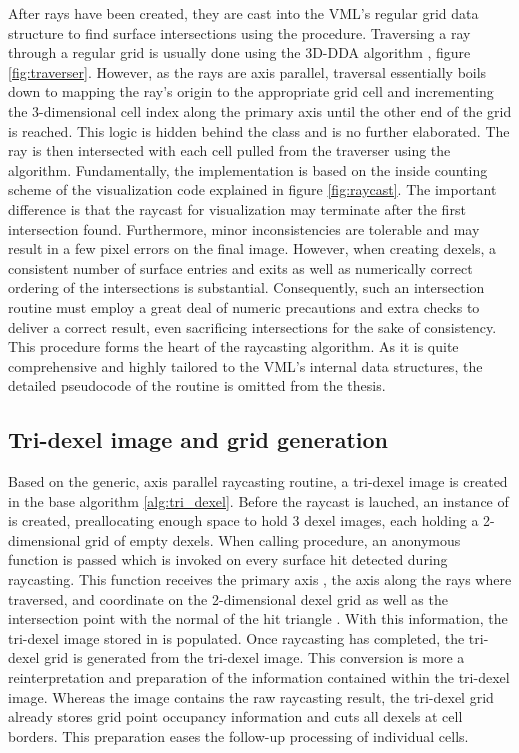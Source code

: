 After rays have been created, they are cast into the VML's regular grid data structure to find surface intersections using the  procedure.
Traversing a ray through a regular grid is usually done using the 3D-DDA algorithm \cite{3DDDA}, \cf figure \ref{fig:traverser}.
However, as the rays are axis parallel, traversal essentially boils down to mapping the ray's origin to the appropriate grid cell and incrementing the 3-dimensional cell index along the primary axis until the other end of the grid is reached.
This logic is hidden behind the  class and is no further elaborated.
%
The ray is then intersected with each cell pulled from the traverser using the  algorithm.
Fundamentally, the implementation is based on the inside counting scheme of the visualization code explained in figure \ref{fig:raycast}.
The important difference is that the raycast for visualization may terminate after the first intersection found.
Furthermore, minor inconsistencies are tolerable and may result in a few pixel errors on the final image.
However, when creating dexels, a consistent number of surface entries and exits as well as numerically correct ordering of the intersections is substantial.
Consequently, such an intersection routine must employ a great deal of numeric precautions and extra checks to deliver a correct result, even sacrificing intersections for the sake of consistency.
This procedure forms the heart of the raycasting algorithm.
As it is quite comprehensive and highly tailored to the VML's internal data structures, the detailed pseudocode of the  routine is omitted from the thesis.


\subsection{Tri-dexel image and grid generation}
\label{sec:tri_dexel_dexel_image_generation}

Based on the generic, axis parallel raycasting routine, a tri-dexel image is created in the base algorithm \ref{alg:tri_dexel}.
Before the raycast is lauched, an instance of  is created, preallocating enough space to hold 3 dexel images, each holding a 2-dimensional grid of empty dexels.
When calling  procedure, an anonymous function is passed which is invoked on every surface hit detected during raycasting.
This function receives the primary axis , \ie the axis along the rays where traversed,  and  coordinate on the 2-dimensional dexel grid as well as the intersection point  with the normal of the hit triangle .
With this information, the tri-dexel image stored in  is populated.
Once raycasting has completed, the tri-dexel grid is generated from the tri-dexel image.
This conversion is more a reinterpretation and preparation of the information contained within the tri-dexel image.
Whereas the image contains the raw raycasting result, the tri-dexel grid already stores grid point occupancy information and cuts all dexels at cell borders.
This preparation eases the follow-up processing of individual cells.

